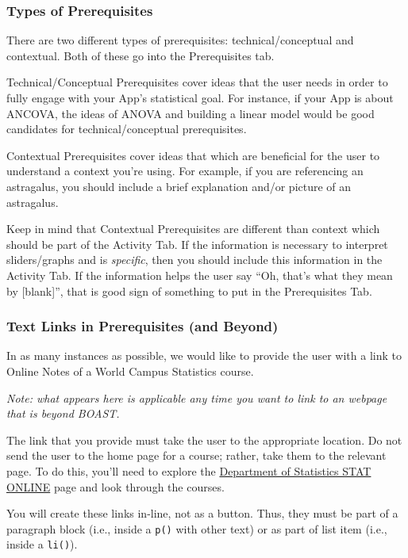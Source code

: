 \documentclass[
]{book}
\begin{document}
\hypertarget{types-of-prerequisites-1}{%
\subsubsection{Types of Prerequisites}\label{types-of-prerequisites-1}}

There are two different types of prerequisites: technical/conceptual and contextual. Both of these go into the Prerequisites tab.

Technical/Conceptual Prerequisites cover ideas that the user needs in order to fully engage with your App's statistical goal. For instance, if your App is about ANCOVA, the ideas of ANOVA and building a linear model would be good candidates for technical/conceptual prerequisites.

Contextual Prerequisites cover ideas that which are beneficial for the user to understand a context you're using. For example, if you are referencing an astragalus, you should include a brief explanation and/or picture of an astragalus.

Keep in mind that Contextual Prerequisites are different than context which should be part of the Activity Tab. If the information is necessary to interpret sliders/graphs and is \emph{specific}, then you should include this information in the Activity Tab. If the information helps the user say ``Oh, that's what they mean by {[}blank{]}'', that is good sign of something to put in the Prerequisites Tab.

\hypertarget{text-links-in-prerequisites-and-beyond-1}{%
\subsubsection{Text Links in Prerequisites (and Beyond)}\label{text-links-in-prerequisites-and-beyond-1}}

In as many instances as possible, we would like to provide the user with a link to Online Notes of a World Campus Statistics course.

\emph{Note: what appears here is applicable any time you want to link to an webpage that is beyond BOAST.}

The link that you provide must take the user to the appropriate location. Do not send the user to the home page for a course; rather, take them to the relevant page. To do this, you'll need to explore the \href{https://online.stat.psu.edu/statprogram/}{Department of Statistics STAT ONLINE} page and look through the courses.

You will create these links in-line, not as a button. Thus, they must be part of a paragraph block (i.e., inside a \texttt{p()} with other text) or as part of list item (i.e., inside a \texttt{li()}).
\end{document}
